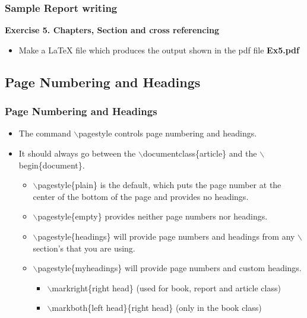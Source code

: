 \documentclass [9pt] {beamer}
\begin{document}
\begin{frame}\frametitle{Sample Report writing}
\rm
\fontsize{9pt}{11pt}\selectfont

\textbf{Exercise 5. Chapters, Section and cross referencing}\\[.30cm]
\begin{itemize}
	\item Make a LaTeX file which produces the output shown in the pdf file \textbf{Ex5.pdf}
	
\end{itemize}
\end{frame}


\subsection{Page Numbering and Headings}\label{Page Numbering and Headings}
\begin{frame}\frametitle{Page Numbering and Headings}
\rm
\fontsize{9pt}{11pt}\selectfont
\begin{itemize}
  \item The command \textcolor[rgb]{0.98,0.00,0.00}{$\backslash$pagestyle} controls page numbering and headings.\\[.30cm]
  \item It should always go between the \textcolor[rgb]{0.98,0.00,0.00}{$\backslash$documentclass\{article\}} and the \textcolor[rgb]{0.98,0.00,0.00}{$\backslash$begin\{document\}}.\\[.30cm]
  \begin{itemize}
    \item \textcolor[rgb]{0.98,0.00,0.00}{$\backslash$pagestyle\{plain\}} is the default, which puts the page number at the center of the bottom of the page and provides no headings.\\[.30cm]
    \item \textcolor[rgb]{0.98,0.00,0.00}{$\backslash$pagestyle\{empty\}} provides neither page numbers nor headings.\\[.30cm]
    \item \textcolor[rgb]{0.98,0.00,0.00}{$\backslash$pagestyle\{headings\}} will provide page numbers and headings from any $\backslash$section's that you are using.\\[.30cm]
\item \textcolor[rgb]{0.98,0.00,0.00}{$\backslash$pagestyle\{myheadings\}} will provide page numbers and custom headings.\\[.30cm]
\begin{itemize}
  \item \textcolor[rgb]{0.98,0.00,0.00}{$\backslash$markright\{right head\}} (used for book, report and article class)\\[.20cm]
  \item \textcolor[rgb]{0.98,0.00,0.00}{$\backslash$markboth\{left head\}\{right head\}} (only in the book class)
\end{itemize}
  \end{itemize}
\end{itemize}
\end{frame}
\end{document}
